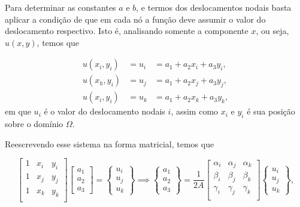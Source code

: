 Para determinar as constantes $a$ e $b$, e termos dos deslocamentos nodais basta aplicar a condição de que em cada nó a função deve assumir o valor do deslocamento respectivo. Isto é, analisando somente a componente $x$, ou seja, $u(x,y)$, temos que

\begin{align}
    u(x_i, y_i) &= u_i &= a_1 + a_2 x_i + a_3 y_i, \\
    u(x_h, y_i) &= u_j &= a_1 + a_2 x_j + a_3 y_j, \\
    u(x_i, y_i) &= u_k &= a_1 + a_2 x_k + a_3 y_k,
\end{align}
em que $u_i$ é o valor do deslocamento nodais $i$, assim como $x_i$ e $y_i$ é sua posição sobre o domínio $\Omega$.
 
Reescrevendo esse sistema na forma matricial, temos que

\begin{equation}
    \begin{bmatrix}
        1 & x_i & y_i \\
        1 & x_j & y_j \\
        1 & x_k & y_k \\
    \end{bmatrix}
    \begin{bmatrix}
        a_1 \\ a_2 \\ a_3
    \end{bmatrix}
    = \begin{Bmatrix}
        u_i \\ u_j \\ u_k
    \end{Bmatrix} \implies
    \begin{Bmatrix}
        a_1 \\ a_2 \\ a_3
    \end{Bmatrix} =
    \frac{1}{2A}
    \begin{bmatrix}
        \alpha_i & \alpha_j & \alpha_k \\
        \beta_i & \beta_j & \beta_k \\
        \gamma_i & \gamma_j & \gamma_k \\
    \end{bmatrix}
    \begin{Bmatrix}
        u_i \\ u_j \\ u_k
    \end{Bmatrix},
    \label{eq:matriz_x}
\end{equation}

